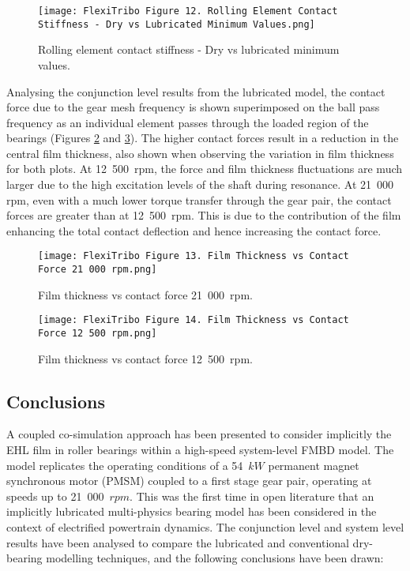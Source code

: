 \begin{figure}
	\centering  
	\texttt{[image: FlexiTribo Figure 12. Rolling Element Contact Stiffness - Dry vs Lubricated Minimum Values.png]}
	\caption{Rolling element contact stiffness - Dry vs lubricated minimum values.}
	\label{Rolling element contact stiffness - Dry vs lubricated minimum values}
\end{figure}

Analysing the conjunction level results from the lubricated model, the contact force due to the gear mesh frequency is shown superimposed on the ball pass frequency as an individual element passes through the loaded region of the bearings (Figures \ref{Film thickness vs contact force 21 000 rpm} and \ref{Film thickness vs contact force 12 500 rpm}). The higher contact forces result in a reduction in the central film thickness, also shown when observing the variation in film thickness for both plots. At 12~500~$\mathrm{rpm}$, the force and film thickness fluctuations are much larger due to the high excitation levels of the shaft during resonance. At 21~000~$\mathrm{rpm}$, even with a much lower torque transfer through the gear pair, the contact forces are greater than at 12~500~$\mathrm{rpm}$. This is due to the contribution of the film enhancing the total contact deflection and hence increasing the contact force.

\begin{figure}
	\centering  
	\texttt{[image: FlexiTribo Figure 13. Film Thickness vs Contact Force 21 000 rpm.png]}
	\caption{Film thickness vs contact force 21~000~$\mathrm{rpm}$.}
	\label{Film thickness vs contact force 21 000 rpm}
\end{figure}

\begin{figure}
	\centering  
	\texttt{[image: FlexiTribo Figure 14. Film Thickness vs Contact Force 12 500 rpm.png]}
	\caption{Film thickness vs contact force 12~500~$\mathrm{rpm}$.}
	\label{Film thickness vs contact force 12 500 rpm}
\end{figure}

\subsection{Conclusions}

A coupled co-simulation approach has been presented to consider implicitly the EHL film in roller bearings within a high-speed system-level FMBD model. The model replicates the operating conditions of a 54~$kW$ permanent magnet synchronous motor (PMSM) coupled to a first stage gear pair, operating at speeds up to 21~000~$rpm$. This was the first time in open literature that an implicitly lubricated multi-physics bearing model has been considered in the context of electrified powertrain dynamics. The conjunction level and system level results have been analysed to compare the lubricated and conventional dry-bearing modelling techniques, and the following conclusions have been drawn:

